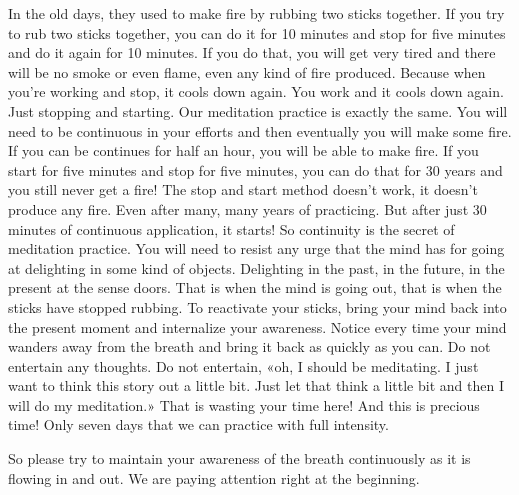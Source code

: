 \documentclass[letterpaper,10pt,english]{sphinxmanual}
\begin{document}
\sphinxAtStartPar
In the old days, they used to make fire by rubbing two sticks together.
If you try to rub two sticks together, you can do it for 10 minutes and stop
for five minutes and do it again for 10 minutes. If you do that, you will get
very tired and there will be no smoke or even flame, even any kind of fire
produced. Because when you’re working and stop, it cools down again. You
work  and  it  cools  down  again.  Just  stopping  and  starting.  Our  meditation
practice is exactly the same. You will need to be continuous in your efforts
and then eventually you will make some fire. If you can be continues for half
an hour, you will be able to make fire. If you start for five minutes and stop
for five minutes, you can do that for 30 years and you still never get a fire!
The  stop  and  start  method  doesn’t  work,  it  doesn’t  produce  any  fire.  Even
after many, many years of practicing. But after just 30 minutes of continuous application, it starts! So continuity is the secret of meditation practice.
You will need to resist any urge that the mind has for going at delighting in
some kind of objects. Delighting in the past, in the future, in the present at
the sense doors. That is when the mind is going out, that is when the sticks
have stopped rubbing. To reactivate your sticks, bring your mind back into
the present moment and internalize your awareness. Notice every time your
mind wanders away from the breath and bring it back as quickly as you can.
Do not entertain any thoughts. Do not entertain, «oh, I should be meditating.
  I just want to think this story out a little bit. Just let that think a little bit and
then I will do my meditation.» That is wasting your time here! And this is
precious time! Only seven days that we can practice with full intensity.

\sphinxAtStartPar
So please try to maintain your awareness of the breath continuously as
it is flowing in and out. We are paying attention right at the beginning.
\end{document}

